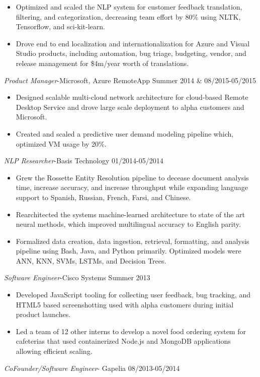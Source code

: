 \documentclass[line,margin]{res}
\begin{document}
\begin{resume}
\begin{itemize}
\item Optimized and scaled the NLP system for customer feedback translation, filtering, and categorization, decreasing team effort by $80\%$ using NLTK, Tensorflow, and sci-kit-learn.
\item Drove end to end localization and internationalization for Azure and Visual Studio products, including automation, bug triage, budgeting, vendor, and release management for \$4m/year worth of translations.
\end{itemize}
{\sl Product Manager}-Microsoft, Azure RemoteApp  \hfill Summer 2014 \& 08/2015-05/2015
\begin{itemize}  \itemsep -4pt
\item Designed scalable multi-cloud network architecture for cloud-based Remote Desktop Service and drove large scale deployment to alpha customers and Microsoft.
\item Created and scaled a predictive user demand modeling pipeline which, optimized VM usage by 20\%.
\end{itemize}
{\sl NLP Researcher}-Basis Technology \hfill 01/2014-05/2014
\begin{itemize}  \itemsep -4pt
\item Grew the Rossette Entity Resolution pipeline to decease document analysis time, increase accuracy, and increase throughput while expanding language support to Spanish, Russian, French, Farsi, and Chinese.
\item Rearchitected the systems machine-learned architecture to state of the art neural methods, which improved multilingual accuracy to English parity.
\item Formalized data creation, data ingestion, retrieval, formatting, and analysis pipeline using Bash, Java, and Python primarily. Optimized models were ANN, KNN, SVMs, LSTMs, and Decision Trees.
\end{itemize}
{\sl Software Engineer}-Cisco Systems \hfill Summer 2013
\begin{itemize}  \itemsep -4pt
\item Developed JavaScript tooling for collecting user feedback, bug tracking, and HTML5 based screenshotting used with alpha customers during initial product launches. 
\item Led a team of 12 other interns to develop a novel food ordering system for cafeterias that used containerized Node.js and MongoDB applications allowing efficient scaling.
\end{itemize}
{\sl CoFounder/Software Engineer}- Gapelia \hfill 08/2013-05/2014

\end{resume}
\end{document}
